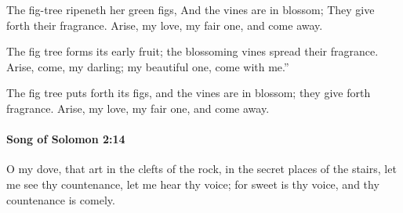			\begin{versebox}
					\item[BHS] 
					\item[LXX] 
					\item[ASV] The fig-tree ripeneth her green figs, And the vines are in blossom; They give forth their fragrance. Arise, my love, my fair one, and come away.
					\item[NIV] The fig tree forms its early fruit; the blossoming vines spread their fragrance. Arise, come, my darling; my beautiful one, come with me.”
					\item[NRSV] The fig tree puts forth its figs, and the vines are in blossom; they give forth fragrance. Arise, my love, my fair one, and come away.
			\end{versebox}

		\paragraph{Song of Solomon 2:14} %
			\label{SONGOFSOLOMON-2-14}

			O my dove, that art in the clefts of the rock, in the secret places of the stairs, let me see thy countenance, let me hear thy voice; for sweet is thy voice, and thy countenance is comely.

